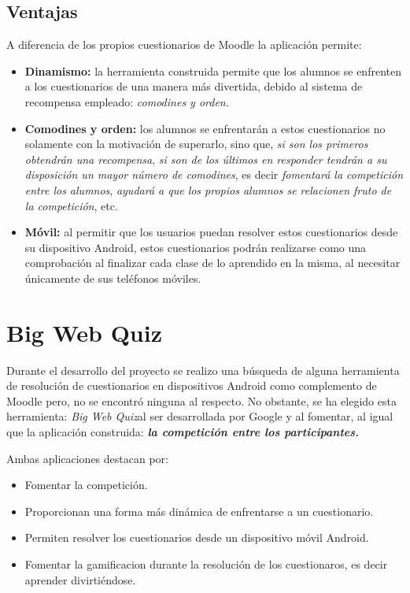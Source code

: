 \subsection{Ventajas}

A diferencia de los propios cuestionarios de Moodle la aplicación permite:

\begin{itemize}
	\item \textbf{Dinamismo:} la herramienta construida permite que los alumnos se enfrenten a los cuestionarios de una manera más divertida, debido al sistema de recompensa empleado: \emph{comodines y orden.}
	
	\item \textbf{Comodines y orden:} los alumnos se enfrentarán a estos cuestionarios no solamente con la motivación de superarlo, sino que, \emph{si son los primeros obtendrán una recompensa}, \emph{si son de los últimos en responder tendrán a su disposición un mayor número de comodines}, es decir \emph{fomentará la competición entre los alumnos}, \emph{ayudará a que los propios alumnos se relacionen fruto de la competición}, etc.
	
	\item \textbf{Móvil:} al permitir que los usuarios puedan resolver estos cuestionarios desde su dispositivo Android, estos cuestionarios podrán realizarse como una comprobación al finalizar cada clase de lo aprendido en la misma, al necesitar únicamente de sus teléfonos móviles.
\end{itemize}

\section{Big Web Quiz}\cite{wiki:bigwebquiz}

Durante el desarrollo del proyecto se realizo una búsqueda de alguna herramienta de resolución de cuestionarios en dispositivos Android como complemento de Moodle pero, no se encontró ninguna al respecto. No obstante, se ha elegido esta herramienta: \emph{Big Web Quiz}al ser desarrollada por Google y al fomentar, al igual que la aplicación construida: \emph{\textbf{la competición entre los participantes.}}


Ambas aplicaciones destacan por:
\begin{itemize}
	\item Fomentar la competición.
	\item Proporcionan una forma más dinámica de enfrentarse a un cuestionario.
	\item Permiten resolver los cuestionarios desde un dispositivo móvil Android.
	\item Fomentar la gamificacion durante la resolución de los cuestionaros, es decir aprender divirtiéndose.
\end{itemize}

